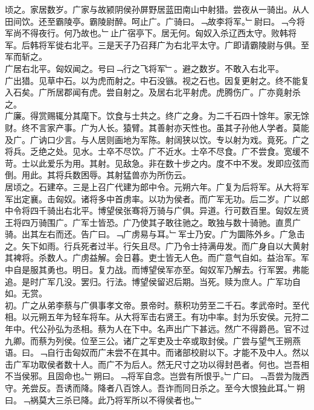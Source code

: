 \documentclass{zhvt-classic}
\begin{document}
\hspace*{2em}顷之。家居数岁。广家与故颍阴侯孙屏野居蓝田南山中射猎。尝夜从一骑出。从人田间饮。还至霸陵亭。霸陵尉醉。呵止广。广骑曰。﹁故李将军。﹂尉曰。﹁今将军尚不得夜行。何乃故也。﹂止广宿亭下。居无何。匈奴入杀辽西太守。败韩将军。后韩将军徙右北平。三是天子乃召拜广为右北平太守。广即请霸陵尉与俱。至军而斩之。\\
\hspace*{2em}广居右北平。匈奴闻之。号曰﹁行之飞将军﹂。避之数岁。不敢入右北平。\\
\hspace*{2em}广出猎。见草中石。以为虎而射之。中石没镞。视之石也。因复更射之。终不能复入石矣。广所居郡闻有虎。尝自射之。及居右北平射虎。虎腾伤广。广亦竟射杀之。\\
\hspace*{2em}广廉。得赏赐辄分其麾下。饮食与士共之。终广之身。为二千石四十馀年。家无馀财。终不言家产事。广为人长。猿臂。其善射亦天性也。虽其子孙他人学者。莫能及广。广讷口少言。与人居则画地为军陈。射阔狭以饮。专以射为戏。竟死。广之将兵。乏绝之处。见水。士卒不尽饮。广不近水。士卒不尽食。广不尝食。宽缓不苛。士以此爱乐为用。其射。见敌急。非在数十步之内。度不中不发。发即应弦而倒。用此。其将兵数困辱。其射猛兽亦为所伤云。\\
\hspace*{2em}居顷之。石建卒。三是上召广代建为郎中令。元朔六年。广复为后将军。从大将军军出定襄。击匈奴。诸将多中首虏率。以功为侯者。而广军无功。后二岁。广以郎中令将四千骑出右北平。博望侯张骞将万骑与广俱。异道。行可数百里。匈奴左贤王将四万骑围广。广军士皆恐。广乃使其子敢往驰之。敢独与数十骑驰。直贯广骑。出其左右而还。告广曰。﹁广虏易与耳。﹂军士乃安。广为圜陈外乡。广急击之。矢下如雨。行兵死者过半。行矢且尽。广乃令士持满毋发。而广身自以大黄射其裨将。杀数人。广虏益解。会日暮。吏士皆无人色。而广意气自如。益治军。军中自是服其勇也。明日。复力战。而博望侯军亦至。匈奴军乃解去。行军罢。弗能追。是时广军几没。罢归。行法。博望侯留迟后期。当死。赎为庶人。广军功自如。无赏。\\
\hspace*{2em}初。广之从弟李蔡与广俱事孝文帝。景帝时。蔡积功劳至二千石。孝武帝时。至代相。以元朔五年为轻车将车。从大将军击右贤王。有功中率。封为乐安侯。元狩二年中。代公孙弘为丞相。蔡为人在下中。名声出广下甚远。然广不得爵邑。官不过九卿。而蔡为列侯。位至三公。诸广之军吏及士卒或取封侯。广尝与望气王朔燕语。曰。﹁自行击匈奴而广未尝不在其中。而诸部校尉以下。才能不及中人。然以击广军功取侯者数十人。而广不为后人。然无尺寸之功以得封邑者。何也。岂吾相不当侯邪。且固命也。﹂朔曰。﹁将军自念。岂尝有所恨乎。﹂广曰。﹁吾尝为陇西守。羌尝反。吾诱而降。降者八百馀人。吾诈而同日杀之。至今大恨独此耳。﹂朔曰。﹁祸莫大三杀已降。此乃将军所以不得侯者也。﹂\\
\end{document}
